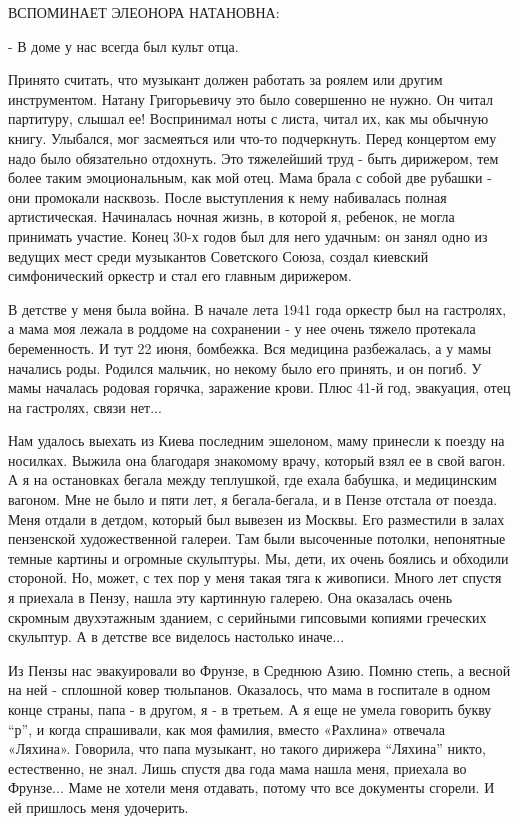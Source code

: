 ВСПОМИНАЕТ ЭЛЕОНОРА НАТАНОВНА:

- В доме у нас всегда был культ отца.

Принято считать, что музыкант должен работать за роялем или другим
инструментом. Натану Григорьевичу это было совершенно не нужно. Он читал
партитуру, слышал ее! Воспринимал ноты с листа, читал их, как мы обычную книгу.
Улыбался, мог засмеяться или что-то подчеркнуть. Перед концертом ему надо было
обязательно отдохнуть. Это тяжелейший труд - быть дирижером, тем более таким
эмоциональным, как мой отец. Мама брала с собой две рубашки - они промокали
насквозь. После выступления к нему набивалась полная артистическая. Начиналась
ночная жизнь, в которой я, ребенок, не могла принимать участие. Конец 30-х
годов был для него удачным: он занял одно из ведущих мест среди музыкантов
Советского Союза, создал киевский симфонический оркестр и стал его главным
дирижером. 

В детстве у меня была война. В начале лета 1941 года оркестр был на гастролях,
а мама моя лежала в роддоме на сохранении - у нее очень тяжело протекала
беременность. И тут 22 июня, бомбежка. Вся медицина разбежалась, а у мамы
начались роды. Родился мальчик, но некому было его принять, и он погиб. У мамы
началась родовая горячка, заражение крови. Плюс 41-й год, эвакуация, отец на
гастролях, связи нет... 

Нам удалось выехать из Киева последним эшелоном, маму принесли к поезду на
носилках. Выжила она благодаря знакомому врачу, который взял ее в свой вагон. А
я на остановках бегала между теплушкой, где ехала бабушка, и медицинским
вагоном. Мне не было и пяти лет, я бегала-бегала, и в Пензе отстала от поезда.
Меня отдали в детдом, который был вывезен из Москвы. Его разместили в залах
пензенской художественной галереи. Там были высоченные потолки, непонятные
темные картины и огромные скульптуры. Мы, дети, их очень боялись и обходили
стороной. Но, может, с тех пор у меня такая тяга к живописи. Много лет спустя я
приехала в Пензу, нашла эту картинную галерею. Она оказалась очень скромным
двухэтажным зданием, с серийными гипсовыми копиями греческих скульптур. А в
детстве все виделось настолько иначе... 

Из Пензы нас эвакуировали во Фрунзе, в Среднюю Азию. Помню степь, а весной на
ней - сплошной ковер тюльпанов. Оказалось, что мама в госпитале в одном конце
страны, папа - в другом, я - в третьем. А я еще не умела говорить букву “р”, и
когда спрашивали, как моя фамилия, вместо «Рахлина» отвечала «Ляхина».
Говорила, что папа музыкант, но такого дирижера \enquote{Ляхина} никто, естественно, не
знал. Лишь спустя два года мама нашла меня, приехала во Фрунзе... Маме не
хотели меня отдавать, потому что все документы сгорели. И ей пришлось меня
удочерить. 


